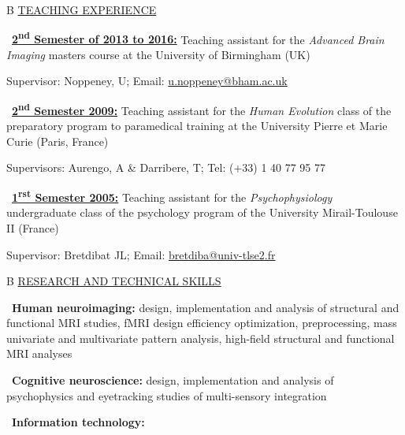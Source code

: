 \documentclass[a4paper,12pt,oneside]{letter}
\begin{document}
{\medskip 

\begin{tabular}{B}
\underline{TEACHING EXPERIENCE}
\end{tabular}

\textbullet~\underline{\textbf{2\textsuperscript{nd} Semester of 2013 to 2016:}} 	Teaching assistant for the \textit{Advanced Brain Imaging} masters course at the University of Birmingham (UK)

Supervisor: Noppeney, U; Email: \href{mailto:u.noppeney@bham.ac.uk}{u.noppeney@bham.ac.uk}

\textbullet~\underline{\textbf{2\textsuperscript{nd} Semester 2009:}} 	Teaching assistant for the \textit{Human Evolution} class of the preparatory program to paramedical training at the University Pierre et Marie Curie (Paris, France)

Supervisors: Aurengo, A \& Darribere, T; Tel: (+33) 1 40 77 95 77

\textbullet~\underline{\textbf{1\textsuperscript{rst} Semester 2005:}} 	Teaching assistant for the \textit{Psychophysiology} undergraduate class of the psychology program of the University Mirail-Toulouse II (France)

Supervisor: Bretdibat JL; Email: \href{mailto:bretdiba@univ-tlse2.fr}{bretdiba@univ-tlse2.fr}


\medskip 

\begin{tabular}{B}
\underline{RESEARCH AND TECHNICAL SKILLS}
\end{tabular}


\textbullet~\textbf{Human neuroimaging:} design, implementation and analysis of structural and functional MRI studies, fMRI design efficiency optimization, preprocessing, mass univariate and multivariate pattern analysis, high-field structural and functional MRI analyses

\textbullet~\textbf{Cognitive neuroscience:} design, implementation and analysis of psychophysics and eyetracking studies of multi-sensory integration 


\pagebreak

\textbullet~\textbf{Information technology:}

}
\end{document}
